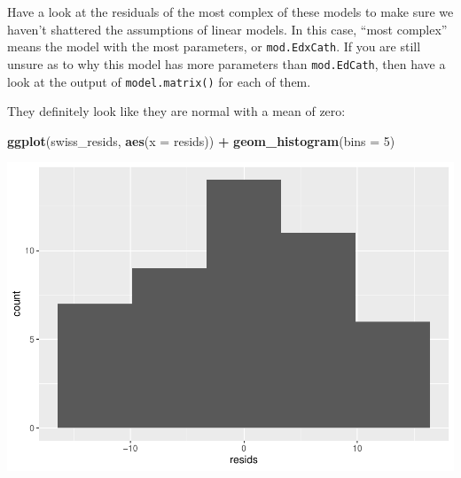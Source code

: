 \documentclass[
]{book}
\newenvironment{Shaded}{\begin{snugshade}}{\end{snugshade}}
\newcommand{\CommentTok}[1]{\textcolor[rgb]{0.56,0.35,0.01}{\textit{#1}}}
\newcommand{\DataTypeTok}[1]{\textcolor[rgb]{0.13,0.29,0.53}{#1}}
\newcommand{\DecValTok}[1]{\textcolor[rgb]{0.00,0.00,0.81}{#1}}
\newcommand{\KeywordTok}[1]{\textcolor[rgb]{0.13,0.29,0.53}{\textbf{#1}}}
\newcommand{\NormalTok}[1]{#1}
\newcommand{\OperatorTok}[1]{\textcolor[rgb]{0.81,0.36,0.00}{\textbf{#1}}}
\newcommand{\StringTok}[1]{\textcolor[rgb]{0.31,0.60,0.02}{#1}}
\begin{document}
Have a look at the residuals of the most complex of these models to make sure we haven't shattered the assumptions of linear models. In this case, ``most complex'' means the model with the most parameters, or \texttt{mod.EdxCath}. If you are still unsure as to why this model has more parameters than \texttt{mod.EdCath}, then have a look at the output of \texttt{model.matrix()} for each of them.

\begin{Shaded}
\end{Shaded}

They definitely look like they are normal with a mean of zero:

\begin{Shaded}
\begin{Highlighting}[]
\KeywordTok{ggplot}\NormalTok{(swiss_resids, }\KeywordTok{aes}\NormalTok{(}\DataTypeTok{x =}\NormalTok{ resids)) }\OperatorTok{+}
\StringTok{  }\KeywordTok{geom_histogram}\NormalTok{(}\DataTypeTok{bins =} \DecValTok{5}\NormalTok{)}
\end{Highlighting}
\end{Shaded}

\includegraphics{worstr_files/figure-latex/unnamed-chunk-301-1.pdf}
\end{document}
